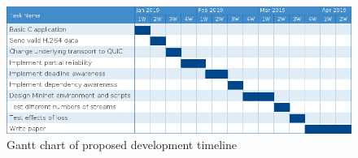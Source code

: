 \documentclass{mprop}
\begin{document}
\begin{figure}[h]
\includegraphics[scale=0.5]{images/gantt}
\centering
\caption{Gantt chart of proposed development timeline}
\end{figure}

\newpage



\end{document}

